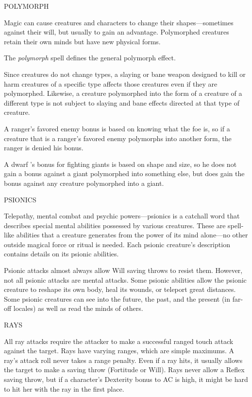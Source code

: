 \documentclass{article}
\begin{document}
\vspace{12pt}
POLYMORPH

Magic can cause creatures and characters to change their shapes---sometimes against 
their will, but usually to gain an advantage. Polymorphed creatures retain their 
own minds but have new physical forms.

The \textit{polymorph }spell defines the general polymorph effect.

Since creatures do not change types, a slaying or bane weapon designed to kill 
or harm creatures of a specific type affects those creatures even if they are polymorphed. 
Likewise, a creature polymorphed into the form of a creature of a different type 
is not subject to slaying and bane effects directed at that type of creature. 

A ranger's favored enemy bonus is based on knowing what the foe is, so if a creature 
that is a ranger's favored enemy polymorphs into another form, the ranger is denied 
his bonus.

A dwarf 's bonus for fighting giants is based on shape and size, so he does not 
gain a bonus against a giant polymorphed into something else, but does gain the 
bonus against any creature polymorphed into a giant.

\vspace{12pt}
PSIONICS

Telepathy, mental combat and psychic powers---psionics is a catchall word that 
describes special mental abilities possessed by various creatures. These are spell-like 
abilities that a creature generates from the power of its mind alone---no other 
outside magical force or ritual is needed. Each psionic creature's description 
contains details on its psionic abilities.

Psionic attacks almost always allow Will saving throws to resist them. However, 
not all psionic attacks are mental attacks. Some psionic abilities allow the psionic 
creature to reshape its own body, heal its wounds, or teleport great distances. 
Some psionic creatures can see into the future, the past, and the present (in far-off 
locales) as well as read the minds of others. 

\vspace{12pt}
RAYS

All ray attacks require the attacker to make a successful ranged touch attack against 
the target. Rays have varying ranges, which are simple maximums. A ray's attack 
roll never takes a range penalty. Even if a ray hits, it usually allows the target 
to make a saving throw (Fortitude or Will). Rays never allow a Reflex saving throw, 
but if a character's Dexterity bonus to AC is high, it might be hard to hit her 
with the ray in the first place.
\end{document}
